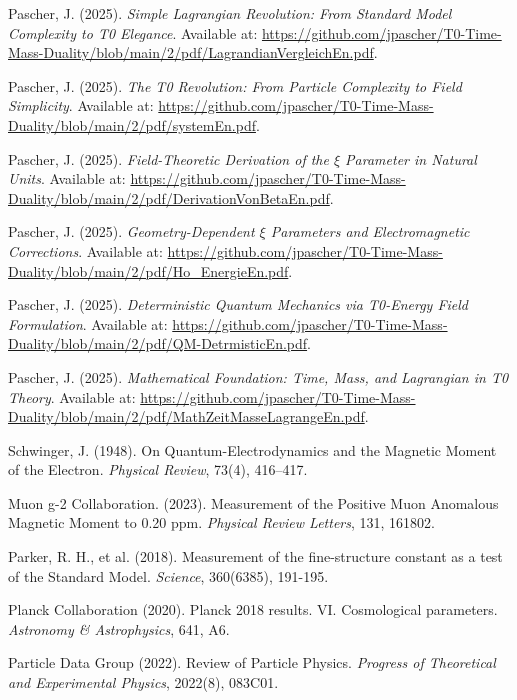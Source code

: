 \documentclass[12pt,a4paper]{article}
\numberwithin{equation}{section}
\begin{document}
\begin{thebibliography}{99}
		Pascher, J. (2025). \emph{Simple Lagrangian Revolution: From Standard Model Complexity to T0 Elegance}. Available at: \url{https://github.com/jpascher/T0-Time-Mass-Duality/blob/main/2/pdf/LagrandianVergleichEn.pdf}.
		
		Pascher, J. (2025). \emph{The T0 Revolution: From Particle Complexity to Field Simplicity}. Available at: \url{https://github.com/jpascher/T0-Time-Mass-Duality/blob/main/2/pdf/systemEn.pdf}.
		
		Pascher, J. (2025). \emph{Field-Theoretic Derivation of the $\xi$ Parameter in Natural Units}. Available at: \url{https://github.com/jpascher/T0-Time-Mass-Duality/blob/main/2/pdf/DerivationVonBetaEn.pdf}.
		
		Pascher, J. (2025). \emph{Geometry-Dependent $\xi$ Parameters and Electromagnetic Corrections}. Available at: \url{https://github.com/jpascher/T0-Time-Mass-Duality/blob/main/2/pdf/Ho_EnergieEn.pdf}.
		
		Pascher, J. (2025). \emph{Deterministic Quantum Mechanics via T0-Energy Field Formulation}. Available at: \url{https://github.com/jpascher/T0-Time-Mass-Duality/blob/main/2/pdf/QM-DetrmisticEn.pdf}.
		
		Pascher, J. (2025). \emph{Mathematical Foundation: Time, Mass, and Lagrangian in T0 Theory}. Available at: \url{https://github.com/jpascher/T0-Time-Mass-Duality/blob/main/2/pdf/MathZeitMasseLagrangeEn.pdf}.
		
		Schwinger, J. (1948). On Quantum-Electrodynamics and the Magnetic Moment of the Electron. \emph{Physical Review}, 73(4), 416–417.
		
		Muon g-2 Collaboration. (2023). Measurement of the Positive Muon Anomalous Magnetic Moment to 0.20 ppm. \emph{Physical Review Letters}, 131, 161802.
		
		Parker, R. H., et al. (2018). Measurement of the fine-structure constant as a test of the Standard Model. \emph{Science}, 360(6385), 191-195.
		
		Planck Collaboration (2020). Planck 2018 results. VI. Cosmological parameters. \emph{Astronomy \& Astrophysics}, 641, A6.
		
		Particle Data Group (2022). Review of Particle Physics. \emph{Progress of Theoretical and Experimental Physics}, 2022(8), 083C01.
		

\end{thebibliography}
\end{document}
